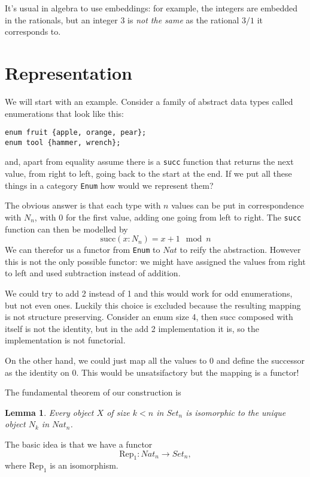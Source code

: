 \documentclass[oneside]{book}
\theoremstyle{plain}
\theoremstyle{definition}
\theoremstyle{plain}
\newtheorem{lemma}{Lemma}
\def\Set{\mathit{Set}}
\def\Nat{\mathit{Nat}}
\begin{document}
It's usual in algebra to use embeddings: for example, the integers are embedded
in the rationals, but an integer $3$ is {\em not the same} as the rational $3/1$ 
it corresponds to.
 
\section{Representation} 
We will start with an example. Consider a family of abstract data types
called enumerations that look like this:
\begin{verbatim}
enum fruit {apple, orange, pear};
enum tool {hammer, wrench};
\end{verbatim}
and, apart from equality assume there is a \verb$succ$ function that 
returns the next value, from right to left, going back to the start 
at the end. If we put all these things in a category \verb$Enum$
how would we represent them?

The obvious answer is that each type with $n$ values
can be put in correspondence with $N_n$, with 0 for the first
value, adding one going from left to right. The \verb$succ$ function
can then be modelled by
$$\mathrm{succ}(x:N_n) = x + 1 \mod n$$
We can therefor us a functor from \verb$Enum$ to $\Nat$ to reify the
abstraction. However this is not the only possible functor: we might have 
assigned the values from right to left and used subtraction instead
of addition. 

We could try to add 2 instead of 1 and this would work for odd
enumerations, but not even ones. Luckily this choice is excluded
because the resulting mapping is not structure preserving.
Consider an enum size 4, then succ composed with itself is not
the identity, but in the add 2 implementation it is, so the
implementation is not functorial.

On the other hand, we could just map all the values to
0 and define the successor as the identity on 0. 
This would be unsatsifactory but the mapping is a functor!
 

The fundamental theorem of our construction is
\begin{lemma}
Every object $X$ of size $k<n$ in $\mathit{Set_n}$ is isomorphic to the unique object $N_k$
in $\mathit{Nat_n}$. 
\end{lemma}

The basic idea is that we have a functor 
\begin{equation}
\mathrm{Rep_1}: \Nat_n\rightarrow \Set_n,
\end{equation}
where $\mathrm{Rep}_1$ is an isomorphism.
\end{document}
